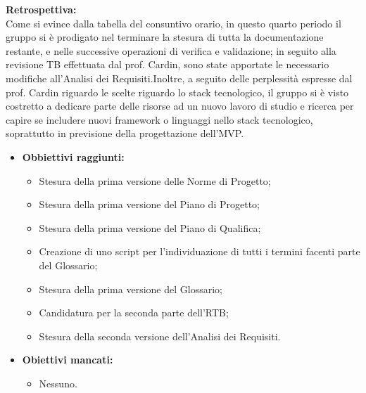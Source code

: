 \textbf{Retrospettiva:} \\
Come si evince dalla tabella del consuntivo orario, in questo quarto periodo il gruppo si è prodigato nel terminare la stesura di tutta la documentazione restante,
e nelle successive operazioni di verifica e validazione; in seguito alla revisione TB effettuata dal prof. Cardin, sono state apportate le necessario modifiche all'Analisi
dei Requisiti.Inoltre, a seguito delle perplessità espresse dal prof. Cardin riguardo le scelte riguardo lo stack tecnologico, il gruppo si è visto costretto a dedicare parte delle risorse ad
un nuovo lavoro di studio e ricerca per capire se includere nuovi framework o linguaggi nello stack tecnologico, soprattutto in previsione della progettazione dell'MVP.
\begin{itemize}
    \item \textbf{Obbiettivi raggiunti:}
    \begin{itemize}
        \item Stesura della prima versione delle Norme di Progetto;
        \item Stesura della prima versione del Piano di Progetto;
        \item Stesura della prima versione del Piano di Qualifica;
        \item Creazione di uno script per l'individuazione di tutti i termini facenti parte del Glossario;
        \item Stesura della prima versione del Glossario;
        \item Candidatura per la seconda parte dell'RTB;
        \item Stesura della seconda versione dell'Analisi dei Requisiti.
    \end{itemize}
    \item \textbf{Obiettivi mancati:}
    \begin{itemize}
        \item Nessuno.
    \end{itemize}
\end{itemize}